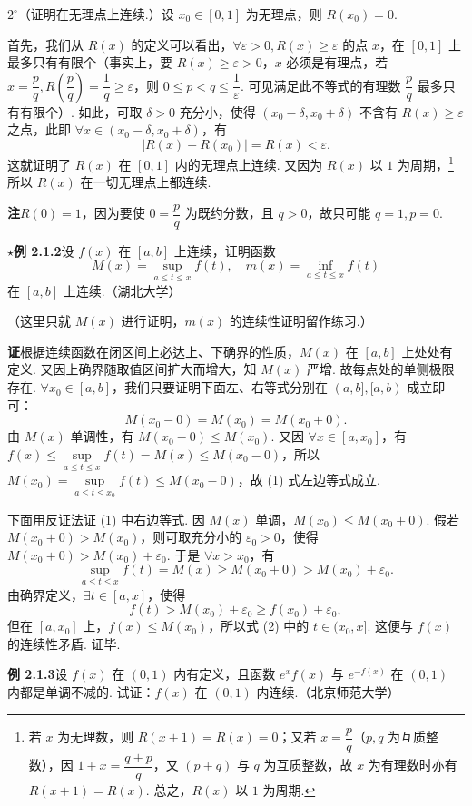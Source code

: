 \documentclass[UTF8,12pt,a4paper,fontset=fandol]{ctexart}
\begin{document}
$2^\circ$（证明在无理点上连续.）设 $x_0\in[0,1]$ 为无理点，则 $R(x_0)=0$.

首先，我们从 $R(x)$ 的定义可以看出，$\forall\varepsilon>0,R(x)\ge\varepsilon$ 的点 $x$，在 $[0,1]$ 上最多只有有限个（事实上，要 $R(x)\ge\varepsilon>0$，$x$ 必须是有理点，若 $x=\dfrac pq,R\left(\dfrac pq\right)=\dfrac1q\ge\varepsilon$，则 $0\le p<q\le\dfrac1\varepsilon$. 可见满足此不等式的有理数 $\dfrac pq$ 最多只有有限个）. 如此，可取 $\delta>0$ 充分小，使得 $(x_0-\delta,x_0+\delta)$ 不含有 $R(x)\ge\varepsilon$ 之点，此即 $\forall x\in(x_0-\delta,x_0+\delta)$，有
\[
  |R(x)-R(x_0)|=R(x)<\varepsilon.
\]
这就证明了 $R(x)$ 在 $[0,1]$ 内的无理点上连续. 又因为 $R(x)$ 以 $1$ 为周期，\footnote{若 $x$ 为无理数，则 $R(x+1)=R(x)=0$；又若 $x=\dfrac pq$（$p,q$ 为互质整数），因 $1+x=\dfrac{q+p}{q}$，又 $(p+q)$ 与 $q$ 为互质整数，故 $x$ 为有理数时亦有 $R(x+1)=R(x)$. 总之，$R(x)$ 以 $1$ 为周期.}所以 $R(x)$ 在一切无理点上都连续.

\noindent\textbf{注}\quad $R(0)=1$，因为要使 $0=\dfrac pq$ 为既约分数，且 $q>0$，故只可能 $q=1,p=0$.

\noindent\textbf{$\star$例 2.1.2}\quad 设 $f(x)$ 在 $[a,b]$ 上连续，证明函数
\[
  M(x)=\sup_{a\le t\le x}f(t),\quad m(x)=\inf_{a\le t\le x}f(t)
\]
在 $[a,b]$ 上连续.（湖北大学）

（这里只就 $M(x)$ 进行证明，$m(x)$ 的连续性证明留作练习.）

\noindent\textbf{证}\quad 根据连续函数在闭区间上必达上、下确界的性质，$M(x)$ 在 $[a,b]$ 上处处有定义. 又因上确界随取值区间扩大而增大，知 $M(x)$ 严增. 故每点处的单侧极限存在. $\forall x_0\in[a,b]$，我们只要证明下面左、右等式分别在 $(a,b],[a,b)$ 成立即可：
\[
  M(x_0-0)=M(x_0)=M(x_0+0).
\tag{1}
\]
由 $M(x)$ 单调性，有 $M(x_0-0)\le M(x_0)$. 又因 $\forall x\in[a,x_0]$，有 $f(x)\le\sup\limits_{a\le t\le x}f(t)=M(x)\le M(x_0-0)$，所以 $M(x_0)=\sup\limits_{a\le t\le x_0}f(t)\le M(x_0-0)$，故 (1) 式左边等式成立.

下面用反证法证 (1) 中右边等式. 因 $M(x)$ 单调，$M(x_0)\le M(x_0+0)$. 假若 $M(x_0+0)>M(x_0)$，则可取充分小的 $\varepsilon_0>0$，使得 $M(x_0+0)>M(x_0)+\varepsilon_0$. 于是 $\forall x>x_0$，有
\[
  \sup_{a\le t\le x}f(t)=M(x)\ge M(x_0+0)>M(x_0)+\varepsilon_0.
\]
由确界定义，$\exists t\in[a,x]$，使得
\[
  f(t)>M(x_0)+\varepsilon_0\ge f(x_0)+\varepsilon_0,
\tag{2}
\]
但在 $[a,x_0]$ 上，$f(x)\le M(x_0)$，所以式 (2) 中的 $t\in(x_0,x]$. 这便与 $f(x)$ 的连续性矛盾. 证毕.

\noindent\textbf{例 2.1.3}\quad 设 $f(x)$ 在 $(0,1)$ 内有定义，且函数 $e^x f(x)$ 与 $e^{-f(x)}$ 在 $(0,1)$ 内都是单调不减的. 试证：$f(x)$ 在 $(0,1)$ 内连续.（北京师范大学）
\end{document}
